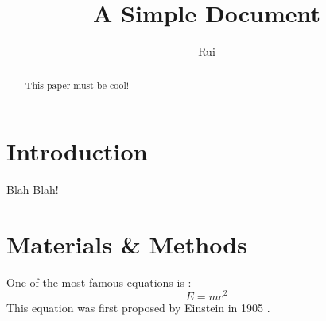 \documentclass[12pt]{article}
\title{A Simple Document}
\author{Rui}
\date{}
\begin{document}
  \maketitle
  
  \begin{abstract}
    This paper must be cool!
  \end{abstract}
  
  \section{Introduction}
    Blah Blah!
  
  \section{Materials \& Methods}
  One of the most famous equations is :
  \begin{equation}
    E = mc^2
  \end{equation}
  This equation was first proposed by Einstein in 1905
  \cite{einstein1905does}.
  
  
  
\end{document}
